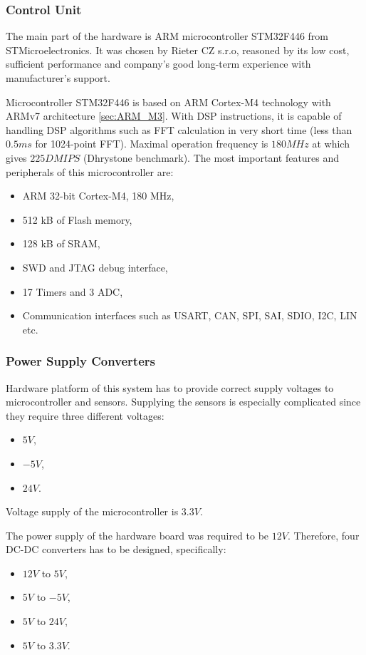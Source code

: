 \documentclass[twoside]{ctuthesis}
\theoremstyle{plain}
\theoremstyle{definition}
\theoremstyle{note}
\begin{document}
\subsubsection{Control Unit}
\label{sec:microController}
The main part of the hardware is ARM microcontroller STM32F446 from STMicroelectronics. It was chosen by Rieter CZ s.r.o, reasoned by its low cost, sufficient performance and company's good long-term experience with manufacturer's support. 

Microcontroller STM32F446 is based on ARM Cortex-M4 technology with ARMv7 architecture \ref{sec:ARM_M3}. With DSP instructions, it is capable of handling DSP algorithms such as FFT calculation in very short time (less than $0.5 ms$ for 1024-point FFT). Maximal operation frequency is $180 MHz$ at which gives $225 DMIPS$ (Dhrystone benchmark). The most important features and peripherals of this microcontroller are:
\begin{itemize}
	\setlength{\itemsep}{5pt}
	\item ARM 32-bit Cortex-M4, 180 MHz,
	\item 512 kB of Flash memory,
	\item 128 kB of SRAM,
	\item SWD and JTAG debug interface,
	\item 17 Timers and 3 ADC,
	\item Communication interfaces such as USART, CAN, SPI, SAI, SDIO, I2C, LIN etc.
\end{itemize}    
\subsubsection{Power Supply Converters}
Hardware platform of this system has to provide correct supply voltages to microcontroller and sensors. Supplying the sensors is especially complicated since they require three different voltages:
\begin{itemize}
	\setlength{\itemsep}{5pt}
	\item $5 V$,
	\item $-5 V$,
	\item $24 V$.
\end{itemize}
Voltage supply of the microcontroller is $3.3 V$.

The power supply of the hardware board was required to be $12 V$. Therefore, four DC-DC converters has to be designed, specifically:
\begin{itemize}
	\setlength{\itemsep}{5pt}
	\item $12 V$ to $5 V$,
	\item $5 V$ to $-5 V$,
	\item $5 V$ to $24 V$,
	\item $5 V$ to $3.3 V$.
\end{itemize}
\end{document}
